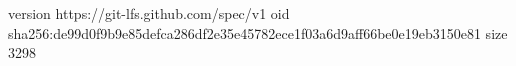 version https://git-lfs.github.com/spec/v1
oid sha256:de99d0f9b9e85defca286df2e35e45782ece1f03a6d9aff66be0e19eb3150e81
size 3298
